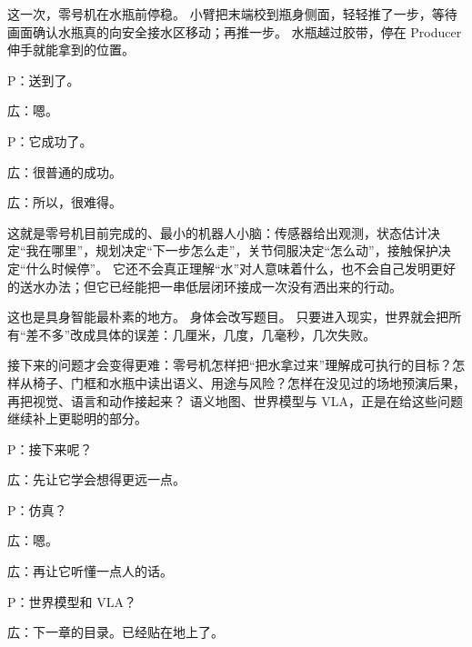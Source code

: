 这一次，零号机在水瓶前停稳。
小臂把末端校到瓶身侧面，轻轻推了一步，等待画面确认水瓶真的向安全接水区移动；再推一步。
水瓶越过胶带，停在 Producer 伸手就能拿到的位置。

P：送到了。

広：嗯。

P：它成功了。

広：很普通的成功。

広：所以，很难得。

这就是零号机目前完成的、最小的机器人小脑：传感器给出观测，状态估计决定“我在哪里”，规划决定“下一步怎么走”，关节伺服决定“怎么动”，接触保护决定“什么时候停”。
它还不会真正理解“水”对人意味着什么，也不会自己发明更好的送水办法；但它已经能把一串低层闭环接成一次没有洒出来的行动。

这也是具身智能最朴素的地方。
身体会改写题目。
只要进入现实，世界就会把所有“差不多”改成具体的误差：几厘米，几度，几毫秒，几次失败。

接下来的问题才会变得更难：零号机怎样把“把水拿过来”理解成可执行的目标？怎样从椅子、门框和水瓶中读出语义、用途与风险？怎样在没见过的场地预演后果，再把视觉、语言和动作接起来？
语义地图、世界模型与 VLA，正是在给这些问题继续补上更聪明的部分。

P：接下来呢？

広：先让它学会想得更远一点。

P：仿真？

広：嗯。

広：再让它听懂一点人的话。

P：世界模型和 VLA？

広：下一章的目录。已经贴在地上了。

